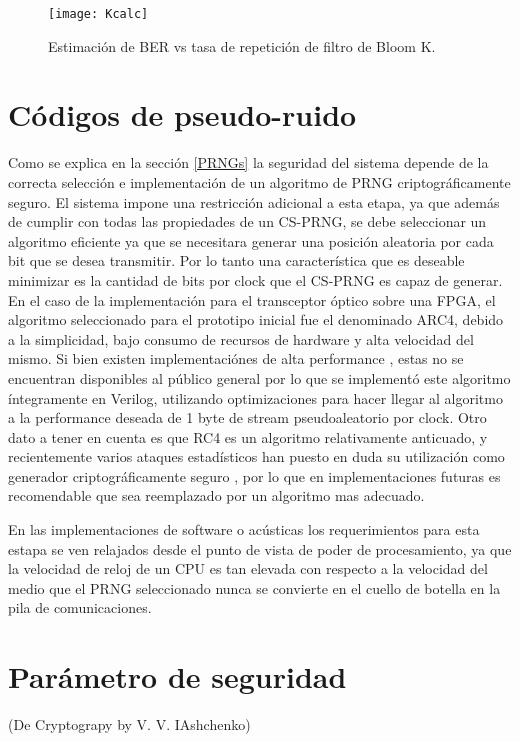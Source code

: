 \begin{figure}[!t]
  \centering
    \texttt{[image: Kcalc]}
    \caption{Estimación de BER vs tasa de repetición de filtro de Bloom K.}
    \label{BERvsK}
\end{figure}

\section{Códigos de pseudo-ruido}
Como se explica en la sección \ref{PRNGs} la seguridad del sistema depende de la correcta selección e implementación de un algoritmo de PRNG criptográficamente seguro.
El sistema impone una restricción adicional a esta etapa, ya que además de cumplir con todas las propiedades de un CS-PRNG, se debe seleccionar un algoritmo eficiente ya que se necesitara generar una posición aleatoria por cada bit que se desea transmitir. Por lo tanto una característica que es deseable minimizar es la cantidad de bits por clock que el CS-PRNG es capaz de generar.
En el caso de la implementación para el transceptor óptico sobre una FPGA, el algoritmo seleccionado para el prototipo inicial fue el denominado ARC4, debido a la simplicidad, bajo consumo de recursos de hardware y alta velocidad del mismo. Si bien existen implementaciónes de alta performance \cite{10.1109/TC.2012.19}, estas no se encuentran disponibles al público general por lo que se implementó este algoritmo íntegramente en Verilog, utilizando optimizaciones para hacer llegar al algoritmo a la performance deseada de 1 byte de stream pseudoaleatorio por clock. Otro dato a tener en cuenta es que RC4 es un algoritmo relativamente anticuado, y recientemente varios ataques estadísticos han puesto en duda su utilización como generador criptográficamente seguro \cite{Sepehrdad:2011:SAR:2008684.2008712}, por lo que en implementaciones futuras es recomendable que sea reemplazado por un algoritmo mas adecuado.

En las implementaciones de software o acústicas los requerimientos para esta estapa se ven relajados desde el punto de vista de poder de procesamiento, ya que la velocidad de reloj de un CPU es tan elevada con respecto a la velocidad del medio que el PRNG seleccionado nunca se convierte en el cuello de botella en la pila de comunicaciones.

\section{Parámetro de seguridad}
(De Cryptograpy by V. V. IAshchenko)\cite{primes}

